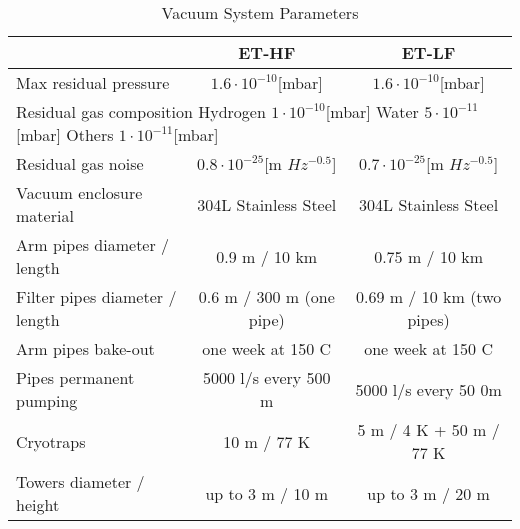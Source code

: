 \begin{table}[h]
\center
\begin{tabular}{| l | c | c |}
\hline
  & ET-HF & ET-LF   \\
\hline
Max residual pressure & $1.6 \cdot 10^{-10} $[mbar] &    $1.6 \cdot 10^{-10} $[mbar]\\
\hline
\multicolumn{3}{|l|}{Residual gas composition  Hydrogen $1 \cdot 10^{-10} $[mbar] Water  $5 \cdot 10^{-11} $[mbar] Others  $1 \cdot 10^{-11} $[mbar]} \\
\hline
Residual gas noise & $0.8 \cdot 10^{-25} $[m $Hz^{-0.5}$] &   $0.7 \cdot 10^{-25} $[m $Hz^{-0.5}$]\\
\hline
Vacuum enclosure material & 304L Stainless Steel & 304L Stainless Steel \\
\hline
Arm pipes diameter / length & 0.9 m / 10 km & 0.75 m / 10 km \\
\hline
Filter pipes diameter / length & 0.6 m / 300 m (one pipe) & 0.69 m / 10 km (two pipes) \\
\hline
Arm pipes bake-out  & one week at 150 C & one week at 150 C \\
\hline
Pipes permanent pumping & 5000 l/s every 500 m & 5000 l/s every 50 0m \\
\hline
Cryotraps & 10 m / 77 K & 5 m / 4 K + 50 m / 77 K \\
\hline
Towers diameter / height & up to 3 m / 10 m & up to 3 m / 20 m \\
\hline
\end{tabular}
\caption{Vacuum System Parameters }
\label{tab:vacpar}
\end{table}

